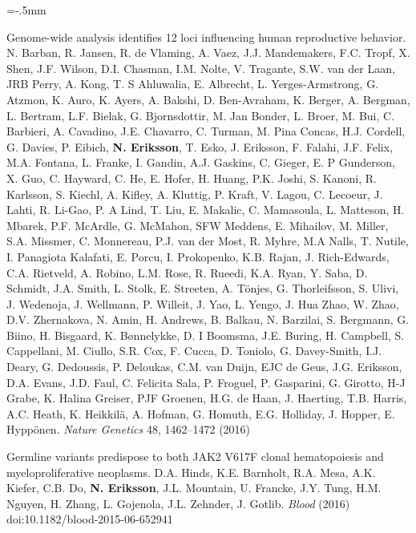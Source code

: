 \documentclass[11pt]{article}
\newenvironment{papers}[1][1]
	{\vspace{-2ex}\leftmargini=16.1mm%
	 \begin{revnumerate}[{#1}]\itemsep=-.5mm}
	{\end{revnumerate}\vspace{-2ex}}
\def\paper{\item}
\def\paperyear#1{\item[\addtocounter{enumi}{-1}%
		 {\makebox[0mm][r]{\makebox[14mm]{#1\hfill\arabic{enumi}.}}}]}
\begin{document}
\begin{papers}[47]
                    \paperyear{2016}
        Genome-wide analysis identifies 12 loci influencing human reproductive behavior.
        N. Barban, R. Jansen, R. de Vlaming, A. Vaez, J.J. Mandemakers, F.C. Tropf, X. Shen, J.F. Wilson, D.I. Chasman, I.M. Nolte, V. Tragante, S.W. van der Laan, JRB Perry, A. Kong, T. S Ahluwalia, E. Albrecht, L. Yerges-Armstrong, G. Atzmon, K. Auro, K. Ayers, A. Bakshi, D. Ben-Avraham, K. Berger, A. Bergman, L. Bertram, L.F. Bielak, G. Bjornsdottir, M. Jan Bonder, L. Broer, M. Bui, C. Barbieri, A. Cavadino, J.E. Chavarro, C. Turman, M. Pina Concas, H.J. Cordell, G. Davies, P. Eibich, \textbf{N. Eriksson}, T. Esko, J. Eriksson, F. Falahi, J.F. Felix, M.A. Fontana, L. Franke, I. Gandin, A.J. Gaskins, C. Gieger, E. P Gunderson, X. Guo, C. Hayward, C. He, E. Hofer, H. Huang, P.K. Joshi, S. Kanoni, R. Karlsson, S. Kiechl, A. Kifley, A. Kluttig, P. Kraft, V. Lagou, C. Lecoeur, J. Lahti, R. Li-Gao, P. A Lind, T. Liu, E. Makalic, C. Mamasoula, L. Matteson, H. Mbarek, P.F. McArdle, G. McMahon, SFW Meddens, E. Mihailov, M. Miller, S.A. Missmer, C. Monnereau, P.J. van der Most, R. Myhre, M.A Nalls, T. Nutile, I. Panagiota Kalafati, E. Porcu, I. Prokopenko, K.B. Rajan, J. Rich-Edwards, C.A. Rietveld, A. Robino, L.M. Rose, R. Rueedi, K.A. Ryan, Y. Saba, D. Schmidt, J.A. Smith, L. Stolk, E. Streeten, A. Tönjes, G. Thorleifsson, S. Ulivi, J. Wedenoja, J. Wellmann, P. Willeit, J. Yao, L. Yengo, J. Hua Zhao, W. Zhao, D.V. Zhernakova, N. Amin, H. Andrews, B. Balkau, N. Barzilai, S. Bergmann, G. Biino, H. Bisgaard, K. Bønnelykke, D. I Boomsma, J.E. Buring, H. Campbell, S. Cappellani, M. Ciullo, S.R. Cox, F. Cucca, D. Toniolo, G. Davey-Smith, I.J. Deary, G. Dedoussis, P. Deloukas, C.M. van Duijn, EJC de Geus, J.G. Eriksson, D.A. Evans, J.D. Faul, C. Felicita Sala, P. Froguel, P. Gasparini, G. Girotto, H-J Grabe, K. Halina Greiser, PJF Groenen, H.G. de Haan, J. Haerting, T.B. Harris, A.C. Heath, K. Heikkilä, A. Hofman, G. Homuth, E.G. Holliday, J. Hopper, E. Hyppönen.
        \textit{Nature Genetics} 48, 1462–1472 (2016)

            \paper
        Germline variants predispose to both JAK2 V617F clonal hematopoiesis and myeloproliferative neoplasms.
        D.A. Hinds, K.E. Barnholt, R.A. Mesa, A.K. Kiefer, C.B. Do, \textbf{N. Eriksson}, J.L. Mountain, U. Francke, J.Y. Tung, H.M. Nguyen, H. Zhang, L. Gojenola, J.L. Zehnder, J. Gotlib.
        \textit{Blood} (2016) doi:10.1182/blood-2015-06-652941


\end{papers}
\end{document}

